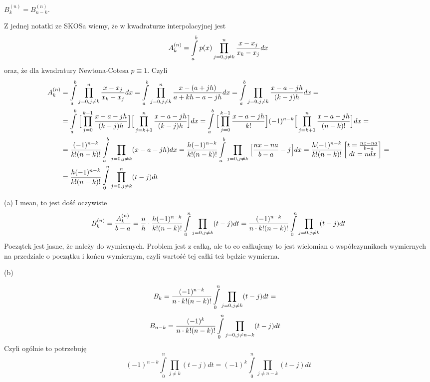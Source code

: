 \documentclass{article}[16pt]
\begin{document}
\point \emph{$B_k^{(n)}=B_{n-k}^{(n)}$.}
\medskip

\medskip

Z jednej notatki ze SKOSa wiemy, że w kwadraturze interpolacyjnej jest
$$A_k^{(n)}=\int\limits_a^bp(x)\prod\limits_{j=0,j\neq k}^n{x-x_j\over x_k-x_j}dx$$
oraz, że dla kwadratury Newtona-Cotesa $p\equiv 1$. Czyli
\begin{align*}
    A_k^{(n)}&=\int\limits_a^b\prod\limits_{j=0,j\neq k}^n{x-x_j\over x_k-x_j}dx=\int\limits_a^b\prod\limits_{j=0,j\neq k}^n{x-(a+jh)\over a+kh-a-jh}dx=\int\limits_a^b\prod\limits_{j=0,j\neq k}{x-a-jh\over (k-j)h}dx=\\
    &=\int\limits_a^b\Big[\prod\limits_{j=0}^{k-1}{x-a-jh\over (k-j)h}\Big]\Big[\prod\limits_{j=k+1}^n{x-a-jh\over (k-j)h}\Big]dx=\int\limits_a^b\Big[\prod\limits_{j=0}^{k-1}{x-a-jh\over k!}\Big](-1)^{n-k}\Big[\prod\limits_{j=k+1}^n{x-a-jh\over(n-k)!}\Big]dx=\\
    &={(-1)^{n-k}\over k!(n-k)!}\int\limits_a^b\prod\limits_{j=0,j\neq k}(x-a-jh)dx={h(-1)^{n-k}\over k!(n-k)!}\int\limits_a^b\prod\limits_{j=0,j\neq k}\Big[{nx-na\over b-a}-j\Big]dx={h(-1)^{n-k}\over k!(n-k)!}\begin{bmatrix}
        t={nx-na\over b-a}\\
        dt=ndx
    \end{bmatrix}=\\
    &={h(-1)^{n-k}\over k!(n-k)!}\int\limits_0^n\prod\limits_{j=0,j\neq k}^n(t-j)dt
\end{align*}
\medskip

{\color{acc}(a)} I mean, to jest dość oczywiste
$$B_k^{(n)}={A_k^{(n)}\over b-a}={n\over h}\cdot {h(-1)^{n-k}\over k!(n-k)!}\int\limits_0^n\prod\limits_{j=0,j\neq k}(t-j)dt={(-1)^{n-k}\over n\cdot k!(n-k)!}\int\limits_0^n\prod\limits_{j=0,j\neq k}(t-j)dt$$
Początek jest jasne, że należy do wymiernych. Problem jest z całką, ale to co całkujemy to jest wielomian o współczynnikach wymiernych na przedziale o początku i końcu wymiernym, czyli wartość tej całki też będzie wymierna.
\medskip

{\color{acc}(b)}

\begin{align*}
    B_k&={(-1)^{n-k}\over n\cdot k!(n-k)!}\int\limits_0^n\prod\limits_{j=0,j\neq k}(t-j)dt=
\end{align*}
\begin{align*}
    B_{n-k}&={(-1)^{k}\over n\cdot k!(n-k)!}\int\limits_0^n\prod\limits_{j=0,j\neq n-k}(t-j)dt
\end{align*}
Czyli ogólnie to potrzebuję
$$(-1)^{n-k}\int\limits_0^n\prod\limits_{j\neq k}(t-j)dt=(-1)^k\int\limits_0^n\prod\limits_{j\neq n-k}(t-j)dt$$
\end{document}
